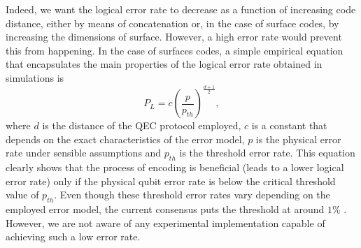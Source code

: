 Indeed, we want the logical error rate to decrease as a function of increasing
code distance, either by means of concatenation or, in the case of surface
codes, by increasing the dimensions of surface. However, a high error rate would
prevent this from happening. In the case of surfaces codes, a simple empirical
equation that encapsulates the main properties of the logical error rate
obtained in simulations is \cite{fowler12_surfac_codes}
\begin{equation}
  \label{eq:1}
  P_L = c\left(\frac{p}{p_{th}}\right)^{\frac{ d+1 }{2}},
\end{equation}
where $d$ is the distance of the QEC protocol employed, $c$ is a constant that
depends on the exact characteristics of the error model, $p$ is the physical
error rate under sensible assumptions and $p_{th}$ is the threshold error rate.
This equation clearly shows that the process of encoding is beneficial (leads to
a lower logical error rate) only if the physical qubit error rate is below the
critical threshold value of $p_{th}$. Even though these threshold error rates
vary depending on the employed error model, the current consensus puts the
threshold at around $1\%$ \cite{terhal15} \cite{Versluis_2017}. However, we are
not aware of any experimental implementation capable of achieving such a low
error rate.


